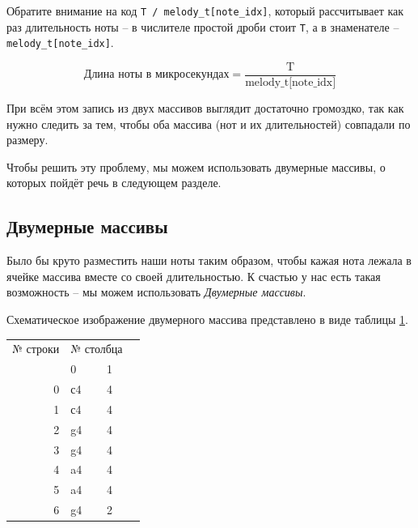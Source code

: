 \documentclass[a4paper,twoside]{book}
\begin{document}
Обратите внимание на код \texttt{T / melody\_t[note\_idx]}, который рассчитывает
как раз длительность ноты -- в числителе простой дроби стоит \texttt{T}, а в
знаменателе -- \texttt{melody\_t[note\_idx]}.

\begin{equation}
  \mbox{Длина ноты в микросекундах} = \frac{\mbox{T}}{\mbox{melody\_t[note\_idx]}}
\end{equation}

При всём этом запись из двух массивов выглядит достаточно громоздко, так как
нужно следить за тем, чтобы оба массива (нот и их длительностей) совпадали по
размеру.

Чтобы решить эту проблему, мы можем использовать двумерные массивы, о которых
пойдёт речь в следующем разделе.

\newpage
\subsection{Двумерные массивы}

Было бы круто разместить наши ноты таким образом, чтобы кажая нота лежала в
ячейке массива вместе со своей длительностью. К счастью у нас есть такая
возможность -- мы можем использовать \emph{Двумерные массивы}.

Схематическое изображение двумерного массива представлено в виде таблицы
\ref{table:array-example-2}.

\begin{table}[ht]
  \centering
  \begin{tabular}{r|l|l|l}
    \multicolumn{1}{l}{№ строки} & \multicolumn{2}{l}{№ столбца}                 &   \\
    \multicolumn{1}{l}{}         & \multicolumn{1}{l}{0} & \multicolumn{1}{l}{1} &   \\ 
    \cline{2-3}
    0                            & с4                    & 4                     &   \\ 
    \cline{2-3}
    1                            & с4                    & 4                     &   \\
    \cline{2-3}
    2                            & g4                    & 4                     &   \\
    \cline{2-3}
    3                            & g4                    & 4                     &   \\
    \cline{2-3}
    4                            & a4                    & 4                     &   \\
    \cline{2-3}
    5                            & a4                    & 4                     &   \\
    \cline{2-3}
    6                            & g4                    & 2                     &   \\
    \cline{2-3}
  \end{tabular}
  \label{table:array-example-2}
\end{table}
\end{document}
